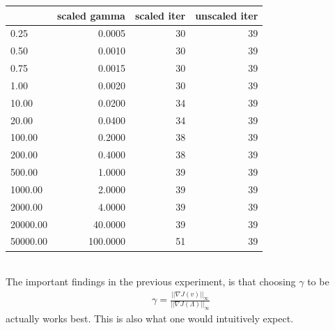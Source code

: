 \documentclass[11pt,a4paper]{article}
\begin{document}
\begin{tabular}{lrrr}
\toprule
{} &  scaled gamma &  scaled iter &  unscaled iter \\
\midrule
0.25     &        0.0005 &           30 &             39 \\
0.50     &        0.0010 &           30 &             39 \\
0.75     &        0.0015 &           30 &             39 \\
1.00     &        0.0020 &           30 &             39 \\
10.00    &        0.0200 &           34 &             39 \\
20.00    &        0.0400 &           34 &             39 \\
100.00   &        0.2000 &           38 &             39 \\
200.00   &        0.4000 &           38 &             39 \\
500.00   &        1.0000 &           39 &             39 \\
1000.00  &        2.0000 &           39 &             39 \\
2000.00  &        4.0000 &           39 &             39 \\
20000.00 &       40.0000 &           39 &             39 \\
50000.00 &      100.0000 &           51 &             39 \\
\bottomrule
\end{tabular}
\\
The important findings in the previous experiment, is that choosing $\gamma$ to be 
\begin{align*}
\gamma = \frac{||\nabla J(v)||_{\infty}}{||\nabla J(\Lambda)||_{\infty}}
\end{align*}
actually works best. This is also what one would intuitively expect.  
\end{document}
